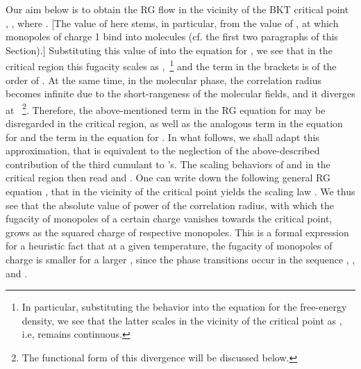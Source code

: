 \documentclass[a4paper,12pt]{article}
\begin{document}
Our aim below is to obtain the RG flow in the vicinity of the BKT critical point~\cite{bkt, kogut, nk} \coordHE{}, \coordHE{}, where
\coordHE{}. [The value of \coordHE{} here stems, in particular, from the
value of \coordHE{}, at which monopoles of charge 1 bind into molecules (cf. the first two paragraphs of this Section).]
Substituting this value of \coordHE{} into the equation for \coordHE{}, we see that in the critical region this fugacity scales
as \coordHE{},~\footnote{In particular, substituting the
behavior \coordHE{} into the equation for the free-energy density, we see that the latter scales
in the vicinity of the critical point as \coordHE{}, i.e, remains continuous.}
and the term \coordHE{} in the brackets is of the order of \coordHE{}. At the same time,
in the molecular phase, the correlation
radius \coordHE{} becomes infinite due to the short-rangeness of the molecular fields, and it diverges at \coordHE{}~\footnote{The
functional form of this divergence will be discussed below.}. Therefore, the above-mentioned term \coordHE{} in the
RG equation for \coordHE{} may be disregarded in the critical region, as well as the analogous term in the equation for \coordHE{}
and the term \coordHE{} in the equation for \coordHE{}. In what follows, we shall adapt this approximation, that is
equivalent to the neglection of the above-described contribution of the third cumulant to \coordHE{}'s.
The scaling behaviors of \coordHE{} and \coordHE{} in the critical region then read \coordHE{} and
\coordHE{}. One can write down the following general RG equation \coordHE{}, that in the vicinity of the critical point yields the scaling law \coordHE{}.
We thus see that the absolute value of power of the correlation radius, with which the
fugacity of monopoles of a certain charge vanishes towards the critical point, grows as the squared charge of respective monopoles.
This is a formal expression for a heuristic fact that
at a given temperature, the fugacity of monopoles of charge \coordHE{} is smaller for a larger \coordHE{},
since the phase transitions occur in the
sequence \coordHE{}, \coordHE{}, and \coordHE{}.
\end{document}
